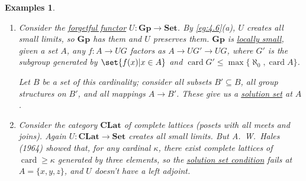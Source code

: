 \documentclass{article}
\let\to\longrightarrow
\newtheorem{nexample}[nthm]{Examples}
\begin{document}
\begin{nexample}\label{eg:4.13}\leavevmode
  \begin{enumerate}[label=(\alph*)]
    \item Consider the \hyperlink{def:forgFunc}{forgetful functor} $U: \mathbf{Gp} \to \mathbf{Set}$.
      By \cref{eg:4.6}(a), $U$ creates all small limits, so $\mathbf{Gp}$ has them and $U$ preserves them.
      $\mathbf{Gp}$ is \hyperlink{def:lsmall}{locally small}, given a set $A$, any $f: A \to UG$ factors as $A \to UG' \to UG$, where $G'$ is the subgroup generated by $\set{f(x) | x \in A}$ and $\operatorname{card} G' \leq \max\{\aleph_0, \operatorname{card} A\}$.

      Let $B$ be a set of this cardinality; consider all subsets $B' \subseteq B$, all group structures on $B'$, and all mappings $A \to B'$.
      These give us a \hyperlink{def:ssc}{solution set} at $A$.
    \item Consider the category $\mathbf{CLat}$ of complete lattices (posets with all meets and joins).
      Again $U: \mathbf{CLat} \to \mathbf{Set}$ creates all small limits.
      But A.\ W.\ Hales (1964) showed that, for any cardinal $\kappa$, there exist complete lattices of $\operatorname{card} \geq\kappa$ generated by three elements, so the \hyperlink{def:ssc}{solution set condition} fails at $A = \{x,y,z\}$, and $U$ doesn't have a left adjoint.
  \end{enumerate}
\end{nexample}
\end{document}
